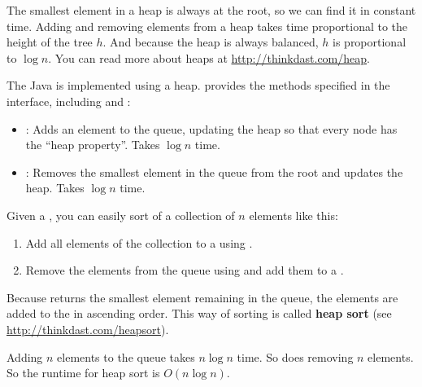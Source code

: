 \documentclass[12pt]{book}
\theoremstyle{exercise}
\begin{document}
The smallest element in a heap is always at the root, so we can find
it in constant time. Adding and removing elements from a heap takes
time proportional to the height of the tree $h$. And because the heap
is always balanced, $h$ is proportional to $\log n$.  You can read
more about heaps at \url{http://thinkdast.com/heap}.


The Java  is implemented using a heap.
 provides the methods specified in the
 interface, including  and :

\begin{itemize}

\item
  : Adds an element to the queue, updating the heap so
  that every node has the ``heap property''. Takes $\log n$ time.

\item
  : Removes the smallest element in the queue from the root
  and updates the heap. Takes $\log n$ time.

\end{itemize}

Given a , you can easily sort of a collection of
$n$ elements like this:

\begin{enumerate}

\item
  Add all elements of the collection to a  using
  .

\item
  Remove the elements from the queue using  and add them to
  a .

\end{enumerate}

Because  returns the smallest element remaining in the
queue, the elements are added to the  in ascending order.
This way of sorting is called {\bf heap sort}
(see \url{http://thinkdast.com/heapsort}).


Adding $n$ elements to the queue takes $n \log n$ time. So
does removing $n$ elements. So the runtime for heap sort is
$O(n \log n)$.

\end{document}
